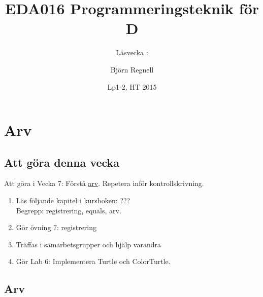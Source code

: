 \documentclass{lecturenotes}
\title[Föreläsningsanteckningar EDA016, 2015]{EDA016 Programmeringsteknik för D}
\subtitle{Läsvecka \vecka: \tema}
\author{Björn Regnell}
\institute{Datavetenskap, LTH}
\date{Lp1-2, HT 2015}
\renewcommand{\vecka}{7}
\newcommand{\tema}{Arv}
\begin{document}
\frame{\titlepage}
\setnextsection{\vecka}
\section[Vecka \vecka: \tema]{\tema}
\frame{\tableofcontents}


\subsection{Att göra denna vecka}
\begin{Slide}{Att göra i Vecka \vecka: Förstå \href{https://sv.wikipedia.org/wiki/Arv_\%28programmering\%29}{arv}. Repetera inför kontrollskrivning.}
\begin{enumerate}
\item Läs följande kapitel i kursboken: ??? \\  
Begrepp: registrering, equals, arv.
\item Gör övning 7: registrering
\item Träffas i samarbetsgrupper och hjälp varandra 
\item Gör Lab 6: Implementera Turtle och ColorTurtle.
\end{enumerate}
\end{Slide}

\subsection{Arv}
\end{document}
